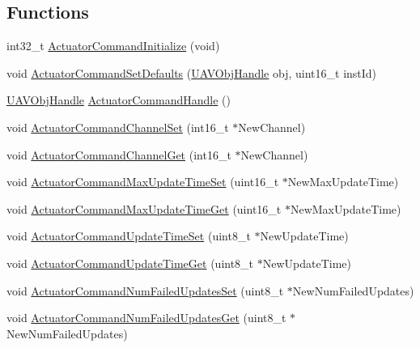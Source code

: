 \subsection*{\-Functions}
\begin{DoxyCompactItemize}
\item 
int32\-\_\-t \hyperlink{group___actuator_command_gaa8dc470d0dd1dc06b508c1162e676cc1}{\-Actuator\-Command\-Initialize} (void)
\item 
void \hyperlink{group___actuator_command_ga9665eacdb4bd8c768c731b40fae1f024}{\-Actuator\-Command\-Set\-Defaults} (\hyperlink{targets_2_u_a_v_objects_2inc_2uavobjectmanager_8h_a279053e22be53ce9f895043aaeb91e3b}{\-U\-A\-V\-Obj\-Handle} obj, uint16\-\_\-t inst\-Id)
\item 
\hyperlink{targets_2_u_a_v_objects_2inc_2uavobjectmanager_8h_a279053e22be53ce9f895043aaeb91e3b}{\-U\-A\-V\-Obj\-Handle} \hyperlink{group___actuator_command_ga088bb013ec11658e6f4af176a7f12810}{\-Actuator\-Command\-Handle} ()
\item 
void \hyperlink{group___actuator_command_gadaa09b1b479d45e87fbb55ca04eef348}{\-Actuator\-Command\-Channel\-Set} (int16\-\_\-t $\ast$\-New\-Channel)
\item 
void \hyperlink{group___actuator_command_ga1bd1edf7fd5418589c0ca69d5611afa0}{\-Actuator\-Command\-Channel\-Get} (int16\-\_\-t $\ast$\-New\-Channel)
\item 
void \hyperlink{group___actuator_command_gaf7343b1eec08a31dd680d327139cd27d}{\-Actuator\-Command\-Max\-Update\-Time\-Set} (uint16\-\_\-t $\ast$\-New\-Max\-Update\-Time)
\item 
void \hyperlink{group___actuator_command_ga89ebe03994436613f3ae589cd545b493}{\-Actuator\-Command\-Max\-Update\-Time\-Get} (uint16\-\_\-t $\ast$\-New\-Max\-Update\-Time)
\item 
void \hyperlink{group___actuator_command_ga4ebc77bb719d32e04f8c6fe552329d5d}{\-Actuator\-Command\-Update\-Time\-Set} (uint8\-\_\-t $\ast$\-New\-Update\-Time)
\item 
void \hyperlink{group___actuator_command_ga7ee94092faf2e6bab50d948e0667974b}{\-Actuator\-Command\-Update\-Time\-Get} (uint8\-\_\-t $\ast$\-New\-Update\-Time)
\item 
void \hyperlink{group___actuator_command_gae6ddde6ac702eebfa957981d593b58c2}{\-Actuator\-Command\-Num\-Failed\-Updates\-Set} (uint8\-\_\-t $\ast$\-New\-Num\-Failed\-Updates)
\item 
void \hyperlink{group___actuator_command_gabac881a8bea5df012d76fecc08fb1110}{\-Actuator\-Command\-Num\-Failed\-Updates\-Get} (uint8\-\_\-t $\ast$\-New\-Num\-Failed\-Updates)
\end{DoxyCompactItemize}


